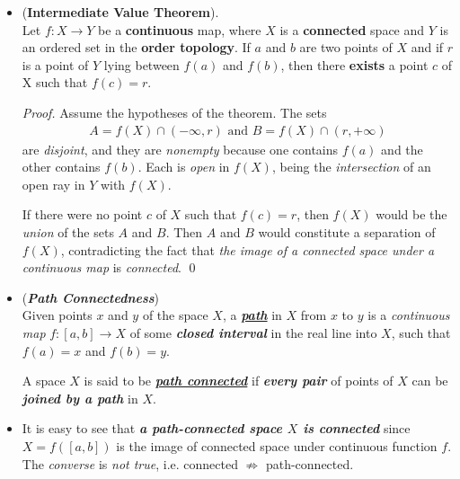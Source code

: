 \documentclass[11pt]{article}
\begin{document}
\begin{itemize}
\item \begin{theorem} (\textbf{Intermediate Value Theorem}).  \citep{munkres2000topology}\\
Let $f : X \rightarrow Y$ be a \textbf{continuous} map, where $X$ is a \textbf{connected} space and $Y$ is an ordered set in the \textbf{order topology}. If $a$ and $b$ are two points of $X$ and if $r$ is a point of $Y$ lying between $f(a)$ and $f(b)$, then there \textbf{exists} a point $c$ of X such that $f(c) = r$.
\end{theorem}
\begin{proof}
Assume the hypotheses of the theorem. The sets
\begin{align*}
A = f(X) \cap (-\infty, r)\text{ and }B = f(X) \cap (r, +\infty)
\end{align*}
are \emph{disjoint}, and they are \emph{nonempty} because one contains $f(a)$ and the other contains $f(b)$. Each is \emph{open} in $f(X)$, being the \emph{intersection} of an open ray in $Y$ with $f(X)$. 

If there were no point $c$ of $X$ such that $f(c) = r$, then $f(X)$ would be the \emph{union} of the
sets $A$ and $B$. Then $A$ and $B$ would constitute a separation of $f(X)$, contradicting the fact that \emph{the image of a connected space under a continuous map} is \emph{connected}. \qed
\end{proof}

\item \begin{definition} (\emph{\textbf{Path Connectedness}})\\
Given points $x$ and $y$ of the space $X$, a \underline{\emph{\textbf{path}}} in $X$ from $x$ to $y$ is a \emph{continuous map} $f : [a, b] \rightarrow X$ of some \emph{\textbf{closed interval}} in the real line into $X$, such that $f(a) = x$ and $f(b) = y$. 

A space $X$ is said to be \underline{\emph{\textbf{path connected}}} if \emph{\textbf{every pair}} of points of $X$ can be \emph{\textbf{joined by a path}} in $X$.
\end{definition}

\item \begin{remark}
It is easy to see that \emph{\textbf{a path-connected space $X$ is connected}} since $X = f([a,b])$ is the image of connected space under continuous function $f$. The \emph{converse} is \emph{not true}, i.e. connected $\not\Rightarrow$ path-connected.
\end{remark}



\end{itemize}
\end{document}
